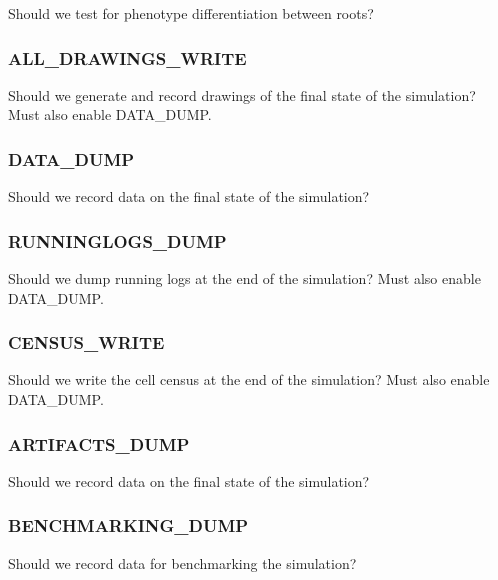 
Should we test for phenotype differentiation between roots?

\subsubsection{ALL\_DRAWINGS\_WRITE}


Should we generate and record drawings of the final state of the simulation?
Must also enable DATA\_DUMP.

\subsubsection{DATA\_DUMP}


Should we record data on the final state of the simulation?

\subsubsection{RUNNINGLOGS\_DUMP}


Should we dump running logs at the end of the simulation?
Must also enable DATA\_DUMP.

\subsubsection{CENSUS\_WRITE}


Should we write the cell census at the end of the simulation?
Must also enable DATA\_DUMP.

\subsubsection{ARTIFACTS\_DUMP}


Should we record data on the final state of the simulation?

\subsubsection{BENCHMARKING\_DUMP}


Should we record data for benchmarking the simulation?

